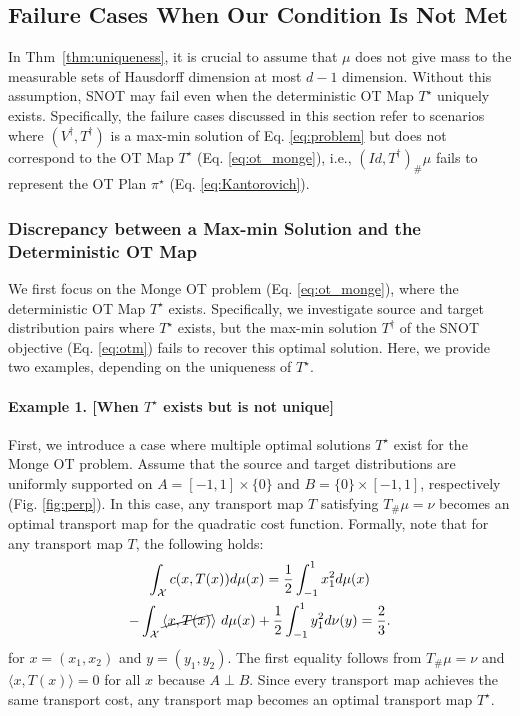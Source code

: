 \subsection{Failure Cases When Our Condition Is Not Met}
\label{sec:failure}

In Thm~\ref{thm:uniqueness}, it is crucial to assume that $\mu$ does not give mass to the measurable sets of Hausdorff dimension at most $d-1$ dimension. Without this assumption, SNOT may fail even when the deterministic OT Map $T^{\star}$ uniquely exists.  Specifically, the failure cases discussed in this section refer to scenarios where $(V^{\dagger}, T^{\dagger})$ is a max-min solution of Eq. \ref{eq:problem} but does not correspond to the OT Map $T^{\star}$ (Eq. \ref{eq:ot_monge}), i.e., $(Id, T^{\dagger})_{\#} \mu$ fails to represent the OT Plan $\pi^{\star}$ (Eq. \ref{eq:Kantorovich}). 

\subsubsection{Discrepancy between a Max-min Solution and the Deterministic OT Map} \label{sec:fail_det}
We first focus on the Monge OT problem (Eq. \ref{eq:ot_monge}), where the deterministic OT Map $T^{\star}$ exists. Specifically, we investigate source and target distribution pairs where $T^{\star}$ exists, but the max-min solution $T^{\dagger}$ of the SNOT objective (Eq. \ref{eq:otm}) fails to recover this optimal solution. 
Here, we provide two examples, depending on the uniqueness of $T^{\star}$.
\paragraph{Example 1. [When $T^{\star}$ exists but is not unique]}
First, we introduce a case where multiple optimal solutions $T^{\star}$ exist for the Monge OT problem. Assume that the source and target distributions are uniformly supported on $A = [-1,1]\times \{0\}$ and $B = \{0 \} \times [-1,1]$, respectively (Fig. \ref{fig:perp}).
In this case, any transport map $T$ satisfying $T_\# \mu = \nu$ becomes an optimal transport map for the quadratic cost function. Formally, note that for any transport map $T$, the following holds:
\vspace{-8pt}
\begin{multline} \label{eq:failure1_t}
    \int_{\mathcal{X} } c(x, T(x)) d\mu(x) 
    = \frac{1}{2} \int^1_{-1} x_{1}^2 d \mu (x) \\
    - \int_{\mathcal{X}} \cancel{\langle x, T(x)} \rangle \ d\mu(x)
    + \frac{1}{2} \int^1_{-1} y_{1}^2 d \nu (y) = \frac{2}{3}.
\end{multline}
for $x=(x_1, x_2)$ and $y=(y_1, y_2)$. The first equality follows from $T_\# \mu = \nu$ and $\langle x, T(x) \rangle = 0 $ for all $x$ because $A \perp B$.
Since every transport map achieves the same transport cost, any transport map becomes an optimal transport map $T^{\star}$. 

